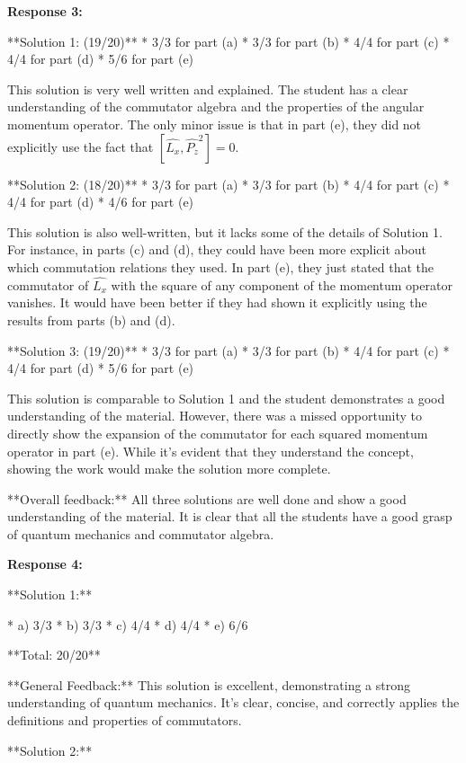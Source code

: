 \documentclass[a4paper,11pt]{article}
\begin{document}
\bigskip    
\textbf{Response 3:}

**Solution 1: (19/20)**
* 3/3 for part (a)
* 3/3 for part (b)
* 4/4 for part (c)
* 4/4 for part (d)
* 5/6 for part (e)

This solution is very well written and explained. The student has a clear understanding of the commutator algebra and the properties of the angular momentum operator. The only minor issue is that in part (e), they did not explicitly use the fact that \(\left[ \hat{L_{x}}, \hat{P_{z}}^2 \right] = 0\). 

**Solution 2: (18/20)**
* 3/3 for part (a)
* 3/3 for part (b)
* 4/4 for part (c)
* 4/4 for part (d)
* 4/6 for part (e)

This solution is also well-written, but it lacks some of the details of Solution 1. For instance, in parts (c) and (d), they could have been more explicit about which commutation relations they used. In part (e), they just stated that the commutator of \( \hat{L_{x}} \) with the square of any component of the momentum operator vanishes. It would have been better if they had shown it explicitly using the results from parts (b) and (d).

**Solution 3: (19/20)**
* 3/3 for part (a)
* 3/3 for part (b)
* 4/4 for part (c)
* 4/4 for part (d)
* 5/6 for part (e)

This solution is comparable to Solution 1 and the student demonstrates a good understanding of the material. However, there was a missed opportunity to directly show the expansion of the commutator for each squared momentum operator in part (e). While it's evident that they understand the concept, showing the work would make the solution more complete.

**Overall feedback:** 
All three solutions are well done and show a good understanding of the material. It is clear that all the students have a good grasp of quantum mechanics and commutator algebra.

\bigskip    
\textbf{Response 4:}

**Solution 1:**

*   a) 3/3
*   b) 3/3
*   c) 4/4
*   d) 4/4
*   e) 6/6

**Total: 20/20**

**General Feedback:** This solution is excellent, demonstrating a strong understanding of quantum mechanics. It's clear, concise, and correctly applies the definitions and properties of commutators.

**Solution 2:**
\end{document}
